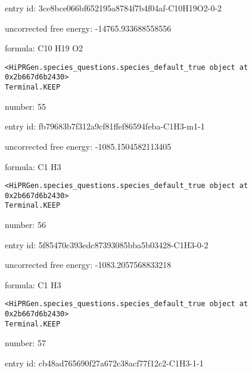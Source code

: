 \documentclass{article}
\begin{document}
entry id: 3ce8bce066bf652195a8784f7b4f04af-C10H19O2-0-2



uncorrected free energy: -14765.933688558556



formula: C10 H19 O2


\vspace{1cm}
\begin{verbatim}
<HiPRGen.species_questions.species_default_true object at 0x2b667d6b2430>
Terminal.KEEP
\end{verbatim}


number: 55



entry id: fb79683b7f312a9cf81ffef86594feba-C1H3-m1-1



uncorrected free energy: -1085.1504582113405



formula: C1 H3


\vspace{1cm}
\begin{verbatim}
<HiPRGen.species_questions.species_default_true object at 0x2b667d6b2430>
Terminal.KEEP
\end{verbatim}


number: 56



entry id: 5f85470c393edc87393085bba5b03428-C1H3-0-2



uncorrected free energy: -1083.2057568833218



formula: C1 H3


\vspace{1cm}
\begin{verbatim}
<HiPRGen.species_questions.species_default_true object at 0x2b667d6b2430>
Terminal.KEEP
\end{verbatim}


number: 57



entry id: cb48ad765690f27a672c38acf77f12c2-C1H3-1-1
\end{document}
